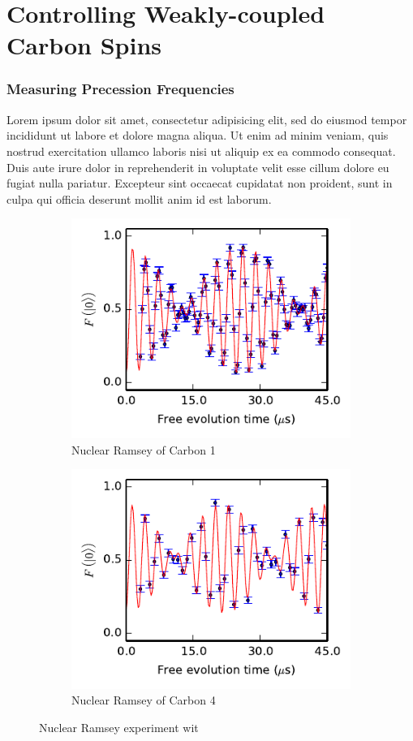 \chapter{Controlling Weakly-coupled Carbon Spins}
\subsection*{Measuring Precession Frequencies}
Lorem ipsum dolor sit amet, consectetur adipisicing elit, sed do eiusmod
tempor incididunt ut labore et dolore magna aliqua. Ut enim ad minim veniam,
quis nostrud exercitation ullamco laboris nisi ut aliquip ex ea commodo
consequat. Duis aute irure dolor in reprehenderit in voluptate velit esse
cillum dolore eu fugiat nulla pariatur. Excepteur sint occaecat cupidatat non
proident, sunt in culpa qui officia deserunt mollit anim id est laborum.


\begin{figure}[htbp]
    \begin{subfigure}[t]{0.49\textwidth}\centering
    \includegraphics{Img/CarbonRamsey_C1.pdf}
    \caption{Nuclear Ramsey of Carbon 1} \label{fig:CR_C1}
    \end{subfigure}
    \begin{subfigure}[t]{0.49\textwidth}\centering
        \includegraphics{Img/CarbonRamsey_C4.pdf}
        \caption{Nuclear Ramsey of Carbon 4}
        \label{fig:CR_C4}
    \end{subfigure}
    \caption{Nuclear Ramsey experiment wit}
\end{figure}



